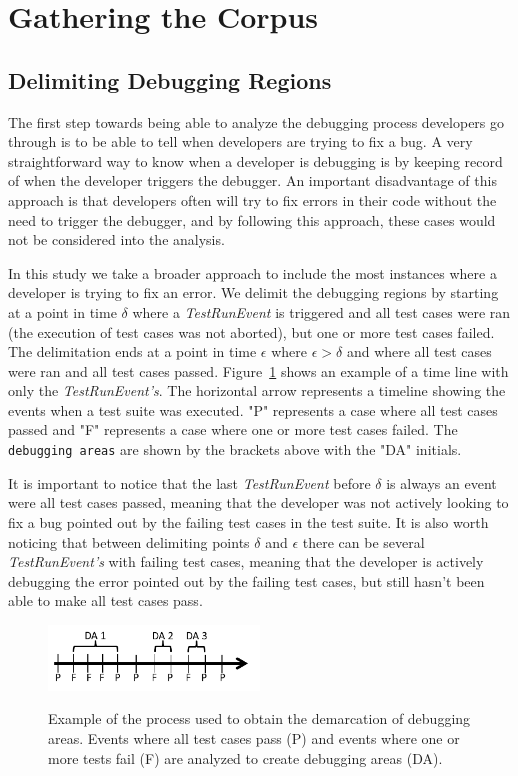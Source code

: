 \documentclass[sigconf]{acmart}
\begin{document}
\section{Gathering the Corpus}
\subsection{Delimiting Debugging Regions}
\label{delimitDebugRegions}
The first step towards being able to analyze the debugging
process developers go through is to be able to tell when
developers are trying to fix a bug. A very straightforward 
way to know when a developer is debugging is by keeping
record of when the developer triggers the debugger. An important
disadvantage of this approach is that 
developers often will try to fix errors in their code without the
need to trigger the debugger, and by following this approach,
these cases would not
be considered into the analysis.

In this study we take a broader approach to include the most 
instances where a developer is trying to fix an error.
We delimit the debugging regions by starting at a point
in time $\delta$ where a \textit{TestRunEvent} is triggered and 
all test cases were ran (the execution of test cases
was not aborted), but one or more test cases failed.
The delimitation ends at a point in time $\epsilon $ where $ \epsilon > \delta$ 
and where all test cases were ran and all test cases passed.
Figure~\ref{demarcations} shows an example of a time line
with only the \textit{TestRunEvent's}. The 
horizontal arrow represents a timeline showing
the events when a test suite was executed. "P" represents a case
where all test cases passed and "F" represents a case where one
or more test cases failed. The \texttt{debugging areas} are shown by
the brackets above with the "DA" initials. 


It is important to notice that the last \textit{TestRunEvent} before $\delta$ 
is always an event were all test cases passed, meaning that the
developer was not actively looking to fix a bug pointed out by the
failing test cases in the test suite. It is also worth noticing
that between delimiting points $\delta$ and $\epsilon$ there can be 
several \textit{TestRunEvent's} with failing test cases, meaning
that the developer is actively debugging the error pointed out
by the failing test cases, but still hasn't been able to make
all test cases pass.

\begin{figure}[h]
\caption{Example of the process used to obtain the demarcation of
debugging areas. Events where all test cases pass (P) and
events where one or more tests fail (F) are analyzed to create
debugging areas (DA).}
\centering
\includegraphics[width=0.5\textwidth]{images/demarcations.png}
\label{demarcations}
\end{figure}
\end{document}
